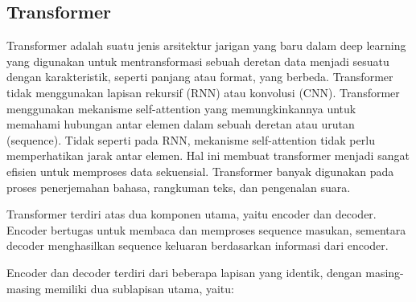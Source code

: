 \subsection{Transformer}
\label{subsec:transformer}

Transformer adalah suatu jenis arsitektur jarigan yang baru dalam deep learning yang digunakan untuk mentransformasi sebuah deretan data menjadi sesuatu dengan karakteristik, seperti panjang atau format, yang berbeda. Transformer tidak menggunakan lapisan rekursif (RNN) atau konvolusi (CNN).  Transformer menggunakan mekanisme self-attention yang memungkinkannya 
untuk memahami hubungan antar elemen dalam sebuah deretan atau urutan 
(sequence). Tidak seperti pada RNN, mekanisme self-attention tidak perlu 
memperhatikan jarak antar elemen. Hal ini membuat transformer menjadi sangat efisien untuk memproses data sekuensial. Transformer banyak digunakan pada proses penerjemahan bahasa, rangkuman teks, dan pengenalan suara.  

Transformer terdiri atas dua komponen utama, yaitu encoder dan decoder. Encoder bertugas untuk membaca dan memproses sequence masukan, sementara decoder menghasilkan sequence keluaran berdasarkan informasi dari encoder.  

Encoder dan decoder terdiri dari beberapa lapisan yang identik, dengan 
masing-masing memiliki dua sublapisan utama, yaitu:
